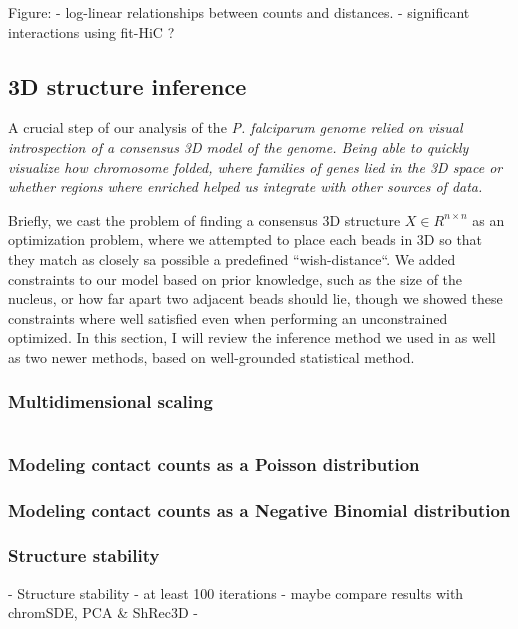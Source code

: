 \documentclass[oupdraft]{bio}
\begin{document}
Figure:
  - log-linear relationships between counts and distances.
  - significant interactions using fit-HiC ?

\subsection{3D structure inference}

A crucial step of our analysis of the \em{P. falciparum} genome relied on
visual introspection of a consensus 3D model of the genome. Being able to
quickly visualize how chromosome folded, where families of genes lied in the
3D space or whether regions where enriched helped us integrate with other
sources of data.

Briefly, we cast the problem of finding a consensus 3D structure $X \in R^{n
\times n}$ as an optimization problem, where we attempted to place each beads
in 3D so that they match as closely sa possible a predefined
``wish-distance``. We added constraints to our model based on prior knowledge,
such as the size of the nucleus, or how far apart two adjacent beads should
lie, though we showed these constraints where well satisfied even when
performing an unconstrained optimized. In this section, I will review the
inference method we used in \citet{ay:three-dimensional} as well as two newer
methods, based on well-grounded statistical method.

\subsubsection{Multidimensional scaling}

\begin{equation}
\end{equation}

\subsubsection{Modeling contact counts as a Poisson distribution}

\subsubsection{Modeling contact counts as a Negative Binomial distribution}


\subsubsection{Structure stability}
- Structure stability
- at least 100 iterations
- maybe compare results with chromSDE, PCA \& ShRec3D 
- 
\end{document}

